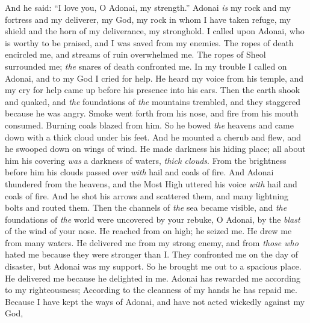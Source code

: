 \begin{biblechapter} %
 And he said: 
“I love you, O Adonai, my strength.”
\verse Adonai \textit{is} my rock and my fortress and my deliverer, 
my God, my rock in whom I have taken refuge, 
my shield and the horn of my deliverance, my stronghold.
\verse I called upon Adonai, who is worthy to be praised, 
and I was saved from my enemies.
\verse The ropes of death encircled me, 
and streams of ruin overwhelmed me.
\verse The ropes of Sheol surrounded me; 
\textit{the} snares of death confronted me.
\verse In my trouble I called on Adonai, 
and to my God I cried for help. 
He heard my voice from his temple, 
and my cry for help 
came up before his presence into his ears.
\verse Then the earth shook and quaked, 
and \textit{the} foundations of \textit{the} mountains trembled, 
and they staggered because he was angry.
\verse Smoke went forth from his nose, 
and fire from his mouth consumed. 
Burning coals blazed from him.
\verse So he bowed \textit{the} heavens and came down 
with a thick cloud under his feet.
\verse And he mounted a cherub and flew, 
and he swooped down on wings of wind.
\verse He made darkness his hiding place; 
all about him his covering 
\textit{was} a darkness of waters, \textit{thick clouds}.
\verse From the brightness before him 
his clouds passed over 
\textit{with} hail and coals of fire.
\verse And Adonai thundered from the heavens, 
and the Most High uttered his voice 
\textit{with} hail and coals of fire.
\verse And he shot his arrows and scattered them, 
and many lightning bolts and routed them.
\verse Then the channels of \textit{the} sea became visible, 
and \textit{the} foundations of \textit{the} world were uncovered 
by your rebuke, O Adonai, 
by the \textit{blast} of the wind of your nose.
\verse He reached from on high; he seized me. 
He drew me from many waters.
\verse He delivered me from my strong enemy, 
and from \textit{those who} hated me 
because they were stronger than I.
\verse They confronted me on the day of disaster, 
but Adonai was my support.
\verse So he brought me out to a spacious place. 
He delivered me because he delighted in me.
\verse Adonai has rewarded me according to my righteousness; 
According to the cleanness of my hands 
he has repaid me.
\verse Because I have kept the ways of Adonai, 
and have not acted wickedly against my God,

\end{biblechapter}
